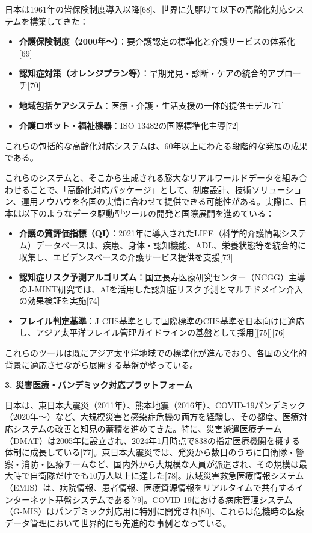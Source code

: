 \documentclass[
  a4paper,
  a4paper,
  11pt]{ltjsbook}
\providecommand{\tightlist}{%
  \setlength{\itemsep}{0pt}\setlength{\parskip}{0pt}}
\begin{document}
日本は1961年の皆保険制度導入以降{[}68{]}、世界に先駆けて以下の高齢化対応システムを構築してきた：

\begin{itemize}
\tightlist
\item
  \textbf{介護保険制度（2000年～）}：要介護認定の標準化と介護サービスの体系化{[}69{]}
\item
  \textbf{認知症対策（オレンジプラン等）}：早期発見・診断・ケアの統合的アプローチ{[}70{]}
\item
  \textbf{地域包括ケアシステム}：医療・介護・生活支援の一体的提供モデル{[}71{]}
\item
  \textbf{介護ロボット・福祉機器}：ISO 13482の国際標準化主導{[}72{]}
\end{itemize}

これらの包括的な高齢化対応システムは、60年以上にわたる段階的な発展の成果である。

これらのシステムと、そこから生成される膨大なリアルワールドデータを組み合わせることで、「高齢化対応パッケージ」として、制度設計、技術ソリューション、運用ノウハウを各国の実情に合わせて提供できる可能性がある。実際に、日本は以下のようなデータ駆動型ツールの開発と国際展開を進めている：

\begin{itemize}
\tightlist
\item
  \textbf{介護の質評価指標（QI）}：2021年に導入されたLIFE（科学的介護情報システム）データベースは、疾患、身体・認知機能、ADL、栄養状態等を統合的に収集し、エビデンスベースの介護サービス提供を支援{[}73{]}
\item
  \textbf{認知症リスク予測アルゴリズム}：国立長寿医療研究センター（NCGG）主導のJ-MINT研究では、AIを活用した認知症リスク予測とマルチドメイン介入の効果検証を実施{[}74{]}
\item
  \textbf{フレイル判定基準}：J-CHS基準として国際標準のCHS基準を日本向けに適応し、アジア太平洋フレイル管理ガイドラインの基盤として採用{[}{[}75{]}{]}{[}76{]}
\end{itemize}

これらのツールは既にアジア太平洋地域での標準化が進んでおり、各国の文化的背景に適応させながら展開する基盤が整っている。

\textbf{3. 災害医療・パンデミック対応プラットフォーム}

日本は、東日本大震災（2011年）、熊本地震（2016年）、COVID-19パンデミック（2020年～）など、大規模災害と感染症危機の両方を経験し、その都度、医療対応システムの改善と知見の蓄積を進めてきた。特に、災害派遣医療チーム（DMAT）は2005年に設立され、2024年1月時点で838の指定医療機関を擁する体制に成長している{[}77{]}。東日本大震災では、発災から数日のうちに自衛隊・警察・消防・医療チームなど、国内外から大規模な人員が派遣され、その規模は最大時で自衛隊だけでも10万人以上に達した{[}78{]}。広域災害救急医療情報システム（EMIS）は、病院情報、患者情報、医療資源情報をリアルタイムで共有するインターネット基盤システムである{[}79{]}。COVID-19における病床管理システム（G-MIS）はパンデミック対応用に特別に開発され{[}80{]}、これらは危機時の医療データ管理において世界的にも先進的な事例となっている。
\end{document}
